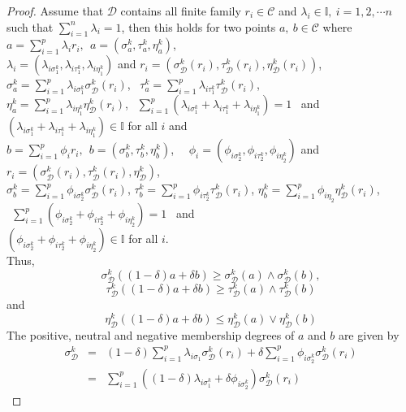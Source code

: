 \documentclass[12pt,letterpaper]{amsart}
\theoremstyle{plain}
\theoremstyle{definition}
\numberwithin{equation}{section}
\begin{document}
\begin{proof}
Assume that $\mathcal{D}$ contains all finite family $r_{i} \in \mathcal{C}$ and $\lambda_{i} \in \mathbb{I},~ i = 1, 2, \cdots n$ such that $\sum \limits_{i=1}^{n} \lambda_i = 1$, then this holds for two points $a,~ b \in \mathcal{C}$ where $a = \sum \limits_{i=1}^{p} \lambda_{i} r_i,~~ a = ( \sigma^k_{a}, \tau^k_{a}, \eta^k_{a} )$,\\ $\lambda_i = ( \lambda_{i \sigma^k_1}, \lambda_{i \tau^k_1}, \lambda_{i \eta^k_1} )$ and $r_i = (\sigma^k_{\mathcal{D}}(r_i), \tau^k_{\mathcal{D}}(r_i), \eta^k_{\mathcal{D}}(r_i) )$, $\sigma^k_{a} = \sum \limits_{i=1}^{p} \lambda_{i \sigma^k_{1}} \sigma^k_{\mathcal{D}}(r_i)$,~ $\tau^k_{a} = \sum \limits_{i=1}^{p} \lambda_{i \tau^k_{1}} \tau^k_{\mathcal{D}}(r_i)$,\\ $\eta^k_{a} = \sum \limits_{i=1}^{p} \lambda_{i \eta^k_{1}} \eta^k_{\mathcal{D}}(r_i)$, $~~\sum \limits_{i=1}^{p} (\lambda_{i \sigma^k_{1}} + \lambda_{i \tau^k_{1}} + \lambda_{i \eta^k_{1}}) = 1$~ and~ $(\lambda_{i \sigma^k_{1}} + \lambda_{i \tau^k_{1}} + \lambda_{i \eta^k_{1}}) \in \mathbb{I}$ for all $i$ and \\$b = \sum \limits_{i=1}^{p} \phi_{i} r_i,~~ b = ( \sigma^k_{b}, \tau^k_{b}, \eta^k_{b} )$,~~ $\phi_i = ( \phi_{i \sigma^k_{2}}, \phi_{i \tau^k_{2}}, \phi_{i \eta^k_{2}} )$ and $r_i = ( \sigma^k_{\mathcal{D}}(r_i), \tau^k_{\mathcal{D}}(r_i), \eta^k_{\mathcal{D}})$,\\ $\sigma^k_{b} = \sum \limits_{i=1}^{p} \phi_{i \sigma^k_{2}} \sigma^k_{\mathcal{D}}(r_i)$, $\tau^k_{b} = \sum \limits_{i=1}^{p} \phi_{i \tau^k_{2}} \tau^k_{\mathcal{D}}(r_i)$, $\eta^k_{b} = \sum \limits_{i=1}^{p} \phi_{i \eta_{2}} \eta^k_{\mathcal{D}}(r_i)$, $~~\sum \limits_{i=1}^{p} (\phi_{i \sigma^k_{2}} + \phi_{i \tau^k_{2}} + \phi_{i \eta^k_{2}}) = 1$~ and\\ $(\phi_{i \sigma^k_{2}} + \phi_{i \tau^k_{2}} + \phi_{i \eta^k_{2}}) \in \mathbb{I}$ for all $i$.\\ Thus, $$\sigma^k_{\mathcal{D}} \left( ( 1 - \delta) a + \delta b \right) \geq \sigma^k_{\mathcal{D}}(a) \wedge \sigma^k_{\mathcal{D}}(b),$$ $$\tau^k_{\mathcal{D}} \left( ( 1 - \delta) a + \delta b \right) \geq \tau^k_{\mathcal{D}}(a) \wedge \tau^k_{\mathcal{D}}(b)$$ and $$\eta^k_{\mathcal{D}} \left( ( 1 - \delta) a + \delta b \right) \leq \eta^k_{\mathcal{D}}(a) \vee \eta^k_{\mathcal{D}}(b)$$ The positive, neutral and negative membership degrees of $a$ and $b$ are given by
\begin{eqnarray*}
\sigma^k_{\mathcal{D}}& = & (1 - \delta) \sum \limits_{i=1}^{p} \lambda_{i \sigma_{1}}\sigma^k_{\mathcal{D}}(r_i) +  \delta \sum \limits_{i=1}^{p} \phi_{i \sigma^k_{2}} \sigma^k_{\mathcal{D}}(r_i)\\
& = & \sum \limits_{i=1}^{p}\left( (1 - \delta) \lambda_{i \sigma^k_{1}} +  \delta \phi_{i \sigma^k_{2}} \right) \sigma^k_{\mathcal{D}}(r_i)
\end{eqnarray*}
	

\end{proof}
\end{document}
